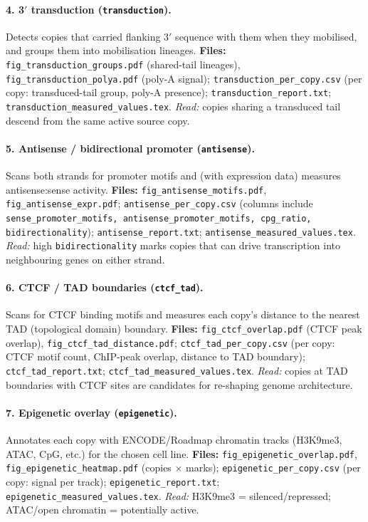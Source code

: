 \documentclass[11pt]{article}
\begin{document}
\paragraph{4. 3$'$ transduction (\texttt{transduction}).}
Detects copies that carried flanking 3$'$ sequence with them when they
mobilised, and groups them into mobilisation lineages.
\textbf{Files:} \texttt{fig\_transduction\_groups.pdf} (shared-tail
lineages), \texttt{fig\_transduction\_polya.pdf} (poly-A signal);
\texttt{transduction\_per\_copy.csv} (per copy: transduced-tail group,
poly-A presence); \texttt{transduction\_report.txt};
\texttt{transduction\_measured\_values.tex}.
\emph{Read:} copies sharing a transduced tail descend from the same active
source copy.

\paragraph{5. Antisense / bidirectional promoter (\texttt{antisense}).}
Scans both strands for promoter motifs and (with expression data) measures
antisense:sense activity.
\textbf{Files:} \texttt{fig\_antisense\_motifs.pdf},
\texttt{fig\_antisense\_expr.pdf};
\texttt{antisense\_per\_copy.csv} (columns include
\texttt{sense\_promoter\_motifs, antisense\_promoter\_motifs, cpg\_ratio,
bidirectionality}); \texttt{antisense\_report.txt};
\texttt{antisense\_measured\_values.tex}.
\emph{Read:} high \texttt{bidirectionality} marks copies that can drive
transcription into neighbouring genes on either strand.

\paragraph{6. CTCF / TAD boundaries (\texttt{ctcf\_tad}).}
Scans for CTCF binding motifs and measures each copy's distance to the
nearest TAD (topological domain) boundary.
\textbf{Files:} \texttt{fig\_ctcf\_overlap.pdf} (CTCF peak overlap),
\texttt{fig\_ctcf\_tad\_distance.pdf};
\texttt{ctcf\_tad\_per\_copy.csv} (per copy: CTCF motif count, ChIP-peak
overlap, distance to TAD boundary); \texttt{ctcf\_tad\_report.txt};
\texttt{ctcf\_tad\_measured\_values.tex}.
\emph{Read:} copies at TAD boundaries with CTCF sites are candidates for
re-shaping genome architecture.

\paragraph{7. Epigenetic overlay (\texttt{epigenetic}).}
Annotates each copy with ENCODE/Roadmap chromatin tracks (H3K9me3, ATAC,
CpG, etc.) for the chosen cell line.
\textbf{Files:} \texttt{fig\_epigenetic\_overlap.pdf},
\texttt{fig\_epigenetic\_heatmap.pdf} (copies $\times$ marks);
\texttt{epigenetic\_per\_copy.csv} (per copy: signal per track);
\texttt{epigenetic\_report.txt}; \texttt{epigenetic\_measured\_values.tex}.
\emph{Read:} H3K9me3 = silenced/repressed; ATAC/open chromatin =
potentially active.
\end{document}
